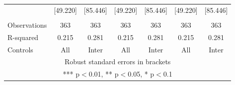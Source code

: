 \begin{tabular}{lcccccc}
 & [49.220] & [85.446] & [49.220] & [85.446] & [49.220] & [85.446] \\
 &  &  &  &  &  &  \\
Observations & 363 & 363 & 363 & 363 & 363 & 363 \\
R-squared & 0.215 & 0.281 & 0.215 & 0.281 & 0.215 & 0.281 \\
 Controls & All & Inter & All & Inter & All & Inter \\ \hline
\multicolumn{7}{c}{ Robust standard errors in brackets} \\
\multicolumn{7}{c}{ *** p$<$0.01, ** p$<$0.05, * p$<$0.1} \\
\end{tabular}

